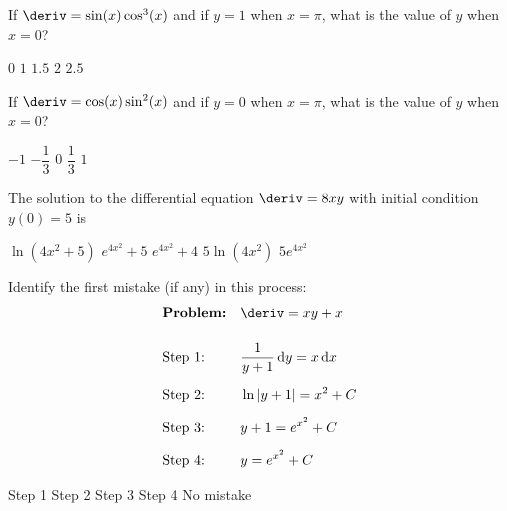 \begin{questions}
    \question If $\deriv = \sin (x)\cos^3 (x)$ and if $y = 1$ when $x = \pi$, what is the value of $y$ when $x = 0$? \\

    \begin{oneparchoices}
        \choice $0$ 
        \choice $1$
        \choice $1.5$
        \choice $2$
        \choice $2.5$
    \end{oneparchoices} \par \horizontalline

    \question If $\deriv = \cos (x)\sin^2 (x)$ and if $y = 0$ when $x = \pi$, what is the value of $y$ when $x = 0$? \\

    \begin{oneparchoices}
        \choice $-1$ 
        \choice $-\dfrac{1}{3}$
        \choice $0$
        \choice $\dfrac{1}{3}$
        \choice $1$
    \end{oneparchoices} \par \horizontalline

    \question The solution to the differential equation $\deriv = 8xy$ with initial condition $y(0) = 5$ is \\
    
    \begin{oneparchoices}
        \choice $\ln \left(4x^2 + 5\right)$
        \choice $e^{4x^2} + 5$
        \choice $e^{4x^2} + 4$
        \choice $5\ln \left(4x^2\right)$
        \choice $5e^{4x^2}$
    \end{oneparchoices} \par \horizontalline

    \question Identify the first mistake (if any) in this process: \begin{align*}
        & \textbf{Problem:} && \deriv = xy + x \\[11pt]
        & \text{Step 1:} && \dfrac{1}{y + 1} \,\mathrm{d}y = x \,\mathrm{d}x \\[5.5pt]
        & \text{Step 2:} && \ln |y + 1| = x^2 + C \\[5.5pt]
        & \text{Step 3:} && y + 1 = e^{x^2} + C \\[5.5pt]
        & \text{Step 4:} && y = e^{x^2} + C
    \end{align*}

    \begin{oneparchoices}
        \choice Step 1
        \choice Step 2
        \choice Step 3
        \choice Step 4
        \choice No mistake
    \end{oneparchoices} \par \horizontalline


\end{questions}
